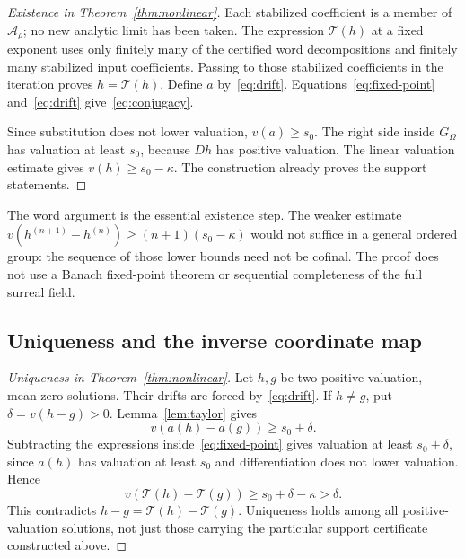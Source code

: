 \documentclass[11pt,letterpaper]{article}
\theoremstyle{definition}
\theoremstyle{remark}
\newcommand{\A}{\mathcal A}
\newcommand{\Gom}{G_{\Omega}}
\numberwithin{equation}{section}
\begin{document}
\begin{proof}[Existence in Theorem~\ref{thm:nonlinear}]
Each stabilized coefficient is a member of $\A_\rho$; no new analytic
limit has been taken.  The expression $\mathcal T(h)$ at a fixed exponent
uses only finitely many of the certified word decompositions and finitely
many stabilized input coefficients.  Passing to those stabilized
coefficients in the iteration proves $h=\mathcal T(h)$.
Define $a$ by~\eqref{eq:drift}.  Equations~\eqref{eq:fixed-point}
and~\eqref{eq:drift} give~\eqref{eq:conjugacy}.

Since substitution does not lower valuation, $v(a)\ge s_0$.
The right side inside $\Gom$ has valuation at least $s_0$, because
$Dh$ has positive valuation.  The linear valuation estimate gives
$v(h)\ge s_0-\kappa$.  The construction already proves the support
statements.
\end{proof}

The word argument is the essential existence step.  The weaker estimate
$v(h^{(n+1)}-h^{(n)})\ge(n+1)(s_0-\kappa)$ would not suffice in a general
ordered group: the sequence of those lower bounds need not be cofinal.
The proof does not use a Banach fixed-point theorem or sequential
completeness of the full surreal field.

\subsection{Uniqueness and the inverse coordinate map}

\begin{proof}[Uniqueness in Theorem~\ref{thm:nonlinear}]
Let $h,g$ be two positive-valuation, mean-zero solutions.  Their drifts are
forced by~\eqref{eq:drift}.  If $h\ne g$, put $\delta=v(h-g)>0$.
Lemma~\ref{lem:taylor} gives
\[
 v(a(h)-a(g))\ge s_0+\delta.
\]
Subtracting the expressions inside~\eqref{eq:fixed-point} gives valuation
at least $s_0+\delta$, since $a(h)$ has valuation at least $s_0$ and
differentiation does not lower valuation.  Hence
\[
 v(\mathcal T(h)-\mathcal T(g))
 \ge s_0+\delta-\kappa>\delta.
\]
This contradicts $h-g=\mathcal T(h)-\mathcal T(g)$.  Uniqueness holds among
all positive-valuation solutions, not just those carrying the particular
support certificate constructed above.
\end{proof}
\end{document}
